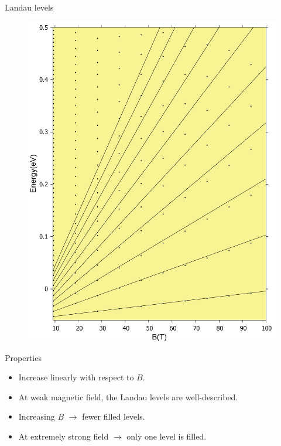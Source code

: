 \documentclass[aspectratio=169,compress,x11names]{beamer}
\begin{document}
	\begin{frame}{Landau levels}
		\begin{multicols}{2}
			\begin{minipage}{\columnwidth}
				\begin{figure}
					\centering
					\includegraphics[width=0.7\linewidth]{../pic/landaulevel_h0_q_797.pdf}
				\end{figure}
			\end{minipage}
			\begin{minipage}{\columnwidth}
				\begin{block}{Properties}
					\begin{itemize}
						\item Increase linearly with respect to $B$.
						\item At weak magnetic field, the Landau levels are well-described.
						\item Increasing $B$ $\to$ fewer filled levels.
						\item At extremely strong field $\to$ only one level is filled.
					\end{itemize}
				\end{block}
			\end{minipage}
		\end{multicols}
	\end{frame}
\end{document}
